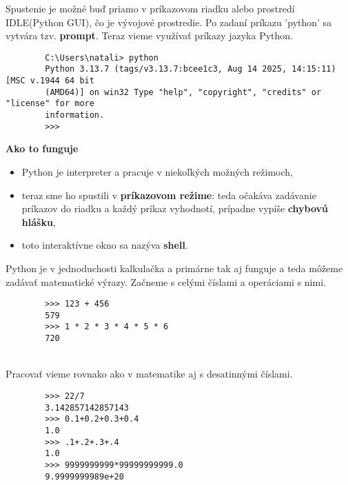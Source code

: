 \documentclass[a4paper,11pt]{report}
\begin{document}
	Spustenie je možné buď priamo v príkazovom riadku alebo prostredí IDLE(Python GUI), čo je vývojové prostredie. Po zadaní príkazu 'python' sa vytvára tzv. \textbf{prompt}. Teraz vieme využívať príkazy jazyka Python.
	
	\begin{verbatim}
		C:\Users\natali> python
		Python 3.13.7 (tags/v3.13.7:bcee1c3, Aug 14 2025, 14:15:11) [MSC v.1944 64 bit 
		(AMD64)] on win32 Type "help", "copyright", "credits" or "license" for more 
		information.
		>>>
	\end{verbatim}
	
	\textbf{Ako to funguje}
			\begin{itemize}
				\item Python je interpreter a pracuje v niekoľkých možných režimoch,
				\item teraz sme ho spustili v \textbf{príkazovom režime}: teda očakáva zadávanie príkazov do riadku a každý príkaz vyhodnotí, prípadne vypíše \textbf{chybovú hlášku},
				\item toto interaktívne okno sa nazýva \textbf{shell}.
			\end{itemize}


	Python je v jednoduchosti kalkulačka a primárne tak aj funguje a teda môžeme zadávať matematické výrazy. Začneme s celými číslami a operáciami s nimi.
	\begin{verbatim}
		>>> 123 + 456
		579
		>>> 1 * 2 * 3 * 4 * 5 * 6
		720
	\end{verbatim}
	
	\noindent{} \\
	
	Pracovať vieme rovnako ako v matematike aj s desatinnými číslami. 
	
	\begin{verbatim}
		>>> 22/7
		3.142857142857143
		>>> 0.1+0.2+0.3+0.4
		1.0
		>>> .1+.2+.3+.4
		1.0
		>>> 9999999999*99999999999.0
		9.9999999989e+20
	\end{verbatim}
	
\end{document}
